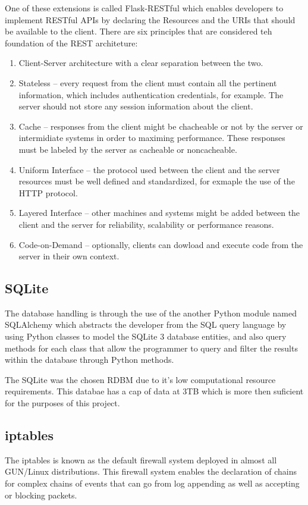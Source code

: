 One of these extensions is called Flask-RESTful which enables developers to
implement RESTful APIs by declaring the Resources and the URIs that should be
available to the client. There are six principles that are considered teh
foundation of the REST architeture:
\begin{enumerate}
	\item Client-Server architecture with a clear separation between the two.
	\item Stateless -- every request from the client must contain all the
		pertinent information, which includes authentication credentials, for
		example. The server should not store any session information about the
		client.
	\item Cache -- responses from the client might be chacheable or not by the
		server or intermidiate systems in order to maximing performance. These
		responses must be labeled by the server as cacheable or noncacheable.
	\item Uniform Interface -- the protocol used between the client and the
		server resources must be well defined and standardized, for exmaple the
		use of the HTTP protocol.
	\item Layered Interface -- other machines and systems might be added between
		the client and the server for reliability, scalability or performance
		reasons.
	\item Code-on-Demand -- optionally, clients can dowload and execute code
		from the server in their own context.
\end{enumerate}

\subsection{SQLite}
\label{chap3:sec:tools:sub:sqlite}
The database handling is through the use of the another Python module named
SQLAlchemy which abstracts the developer from the SQL query language by using
Python classes to model the SQLite 3 database entities, and also query methods
for each class that allow the programmer to query and filter the results within
the database through Python methods.

The SQLite was the chosen RDBM due to it's low computational resource
requirements. This databae has a cap of data at 3TB which is more then suficient
for the purposes of this project.

\subsection{iptables}
\label{chap3:sec:tools:sub:iptables}
The iptables is known as the default firewall system deployed in almost all
GUN/Linux distributions. This firewall system enables the declaration of chains
for complex chains of events that can go from log appending as well as accepting
or blocking packets.

